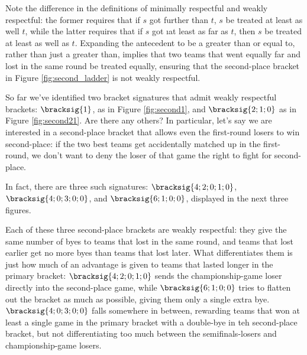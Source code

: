 {    Note the difference in the definitions of minimally respectful and weakly respectful: the former requires that if $s$ got further than $t$, $s$ be treated at least as well $t$, while the latter requires that if $s$ got \i{at least as far as} $t$, then $s$ be treated at least as well as $t$. Expanding the antecedent to be a greater than or equal to, rather than just a greater than, implies that two teams that went equally far and lost in the same round be treated equally, ensuring that the second-place bracket in Figure \ref{fig:second_ladder} is not weakly respectful.
    
    So far we've identified two bracket signatures that admit weakly respectful brackets: $\bracksig{1}$, as in Figure \ref{fig:second1}, and $\bracksig{2;1;0}$ as in Figure \ref{fig:second21}. Are there any others? In particular, let's say we are interested in a second-place bracket that allows even the first-round losers to win second-place: if the two best teams get accidentally matched up in the first-round, we don't want to deny the loser of that game the right to fight for second-place.

    In fact, there are three such signatures: $\bracksig{4;2;0;1;0}$, $\bracksig{4;0;3;0;0}$, and $\bracksig{6;1;0;0}$, displayed in the next three figures.


    Each of these three second-place brackets are weakly respectful: they give the same number of byes to teams that lost in the same round, and teams that lost earlier get no more byes than teams that lost later. What differentiates them is just how much of an advantage is given to teams that lasted longer in the primary bracket: $\bracksig{4;2;0;1;0}$ sends the championship-game loser directly into the second-place game, while $\bracksig{6;1;0;0}$ tries to flatten out the bracket as much as possible, giving them only a single extra bye. $\bracksig{4;0;3;0;0}$ falls somewhere in between, rewarding teams that won at least a single game in the primary bracket with a double-bye in teh second-place bracket, but not differentiating too much between the semifinals-losers and championship-game losers.




    

}